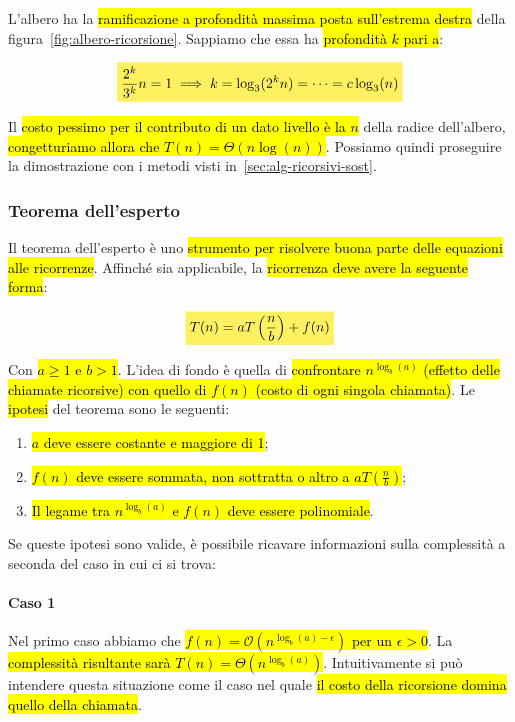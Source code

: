 \documentclass[a4paper,11pt,oneside]{article}
\theoremstyle{plain}
\theoremstyle{definition}
\theoremstyle{remark}
\newcommand{\mhl}[1]{\colorbox{hlcolor}{$\displaystyle #1$}}
\begin{document}
L'albero ha la \hl{ramificazione a profondità massima posta sull'estrema destra}
della figura~\ref{fig:albero-ricorsione}. Sappiamo che essa ha \hl{profondità $k$
pari a}:

\begin{equation}
  \mhl{
    \frac{2^k}{3^k} n = 1 \implies{} k = \log_3(2^k n) = \cdots = c\log_3(n)
  }
\end{equation}

Il \hl{costo pessimo per il contributo di un dato livello è la $n$} della radice
dell'albero, \hl{congetturiamo allora che $T(n) = \Theta(n\log(n))$}. Possiamo
quindi proseguire la dimostrazione con i metodi visti
in~\ref{sec:alg-ricorsivi-sost}.

\subsubsection{Teorema dell'esperto}\label{sec:alg-ricorsivi-esperto}

Il teorema dell'esperto è uno \hl{strumento per risolvere buona parte delle
equazioni alle ricorrenze}. Affinché sia applicabile, la \hl{ricorrenza deve
avere la seguente forma}:

\begin{equation}
  \mhl{
    T(n) = aT\left(\frac{n}{b}\right) + f(n)
  }
\end{equation}

Con \hl{$a \geq 1$ e $b>1$}. L'idea di fondo è quella di \hl{confrontare
$n^{\log_b(a)}$ (effetto delle chiamate ricorsive) con quello di $f(n)$ (costo
di ogni singola chiamata)}. Le \hl{ipotesi} del teorema sono le seguenti:

\begin{enumerate}
  \item \hl{$a$ deve essere costante e maggiore di 1};
  \item \hl{$f(n)$ deve essere sommata, non sottratta o altro a
    $aT(\frac{n}{b})$};
  \item \hl{Il legame tra $n^{\log_b(a)}$ e $f(n)$ deve essere polinomiale}.
\end{enumerate}

Se queste ipotesi sono valide, è possibile ricavare informazioni sulla
complessità a seconda del caso in cui ci si trova:

\paragraph{Caso 1} Nel primo caso abbiamo che \hl{$f(n) =
\mathcal{O}(n^{\log_b(a) - \epsilon})$ per un $\epsilon>0$}. La \hl{complessità
risultante sarà $T(n) = \Theta(n^{\log_b(a)})$}. Intuitivamente si può intendere
questa situazione come il caso nel quale \hl{il costo della ricorsione domina
quello della chiamata}.
\end{document}
